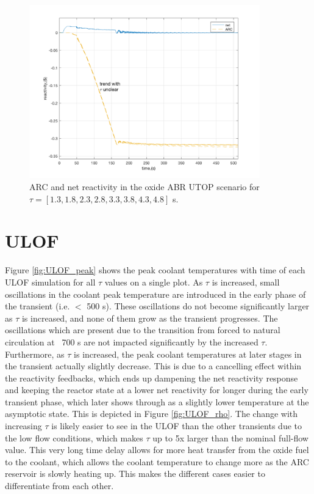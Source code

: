\documentclass[11pt, oneside]{article}   	%
\begin{document}
\begin{figure}[h!]
\includegraphics[width=10cm]{UTOP_rho}
\centering
\caption{ARC and net reactivity in the oxide ABR UTOP scenario for $\tau=[1.3, 1.8, 2.3, 2.8, 3.3, 3.8, 4.3, 4.8]$ s.}
\label{fig:UTOP_rho}
\end{figure}

\section{ULOF}
Figure \ref{fig:ULOF_peak} shows the peak coolant temperatures with time of each ULOF simulation for all $\tau$ values on a single plot.
As $\tau$ is increased, small oscillations in the coolant peak temperature are introduced in the early phase of the transient (i.e. $<$ 500 s).
These oscillations do not become significantly larger as $\tau$ is increased, and none of them grow as the transient progresses.
The oscillations which are present due to the transition from forced to natural circulation at ~700 s are not impacted significantly by the increased $\tau$.
Furthermore, as $\tau$ is increased, the peak coolant temperatures at later stages in the transient actually slightly decrease.
This is due to a cancelling effect within the reactivity feedbacks, which ends up dampening the net reactivity response and keeping the reactor state at a lower net reactivity for longer during the early transient phase, which later shows through as a slightly lower temperature at the asymptotic state.
This is depicted in Figure \ref{fig:ULOF_rho}.
The change with increasing $\tau$ is likely easier to see in the ULOF than the other transients due to the low flow conditions, which makes $\tau$ up to 5x larger than the nominal full-flow value. 
This very long time delay allows for more heat transfer from the oxide fuel to the coolant, which allows the coolant temperature to change more as the ARC reservoir is slowly heating up. 
This makes the different cases easier to differentiate from each other.
\end{document}
